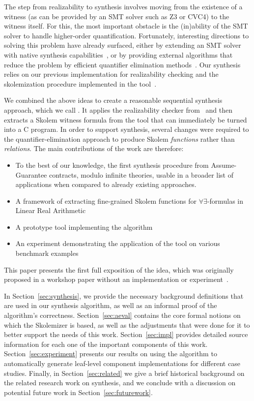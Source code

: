 The step from realizability to synthesis involves moving from the existence of a witness (as can be provided by an SMT solver such as Z3 or CVC4) to the witness itself.  For this, the most important obstacle is the (in)ability of the SMT solver to handle higher-order quantification. Fortunately, interesting directions to solving this problem have already surfaced, either by extending an SMT solver with native synthesis capabilities~\cite{reynoldscounterexample}, or by providing external algorithms that reduce the problem by efficient quantifier elimination methods~\cite{fedyukovichae}.  Our synthesis relies on our previous implementation for realizability checking and the skolemization procedure implemented in the \aeval tool~\cite{fedyukovichae}.


We combined the above ideas to create a reasonable sequential synthesis
approach, which we call \toolname.  It applies the realizability checker from~\cite{Katis15:Realizability} and then extracts a Skolem witness formula from the \aeval tool that can immediately be turned into a C program.  In order to support synthesis, several changes were required to the quantifier-elimination approach to produce Skolem {\em functions} rather than {\em relations}.  The main contributions of the work are therefore:
\begin{itemize}
	\item To the best of our knowledge, the first synthesis procedure from
	Assume-Guarantee contracts, modulo infinite theories, usable in a broader
	list of applications when compared to already existing approaches.
	\item A framework of extracting fine-grained Skolem functions for $\forall\exists$-formulas in Linear Real Arithmetic
	\item A prototype tool implementing the algorithm
	\item An experiment demonstrating the application of the tool on various benchmark examples
\end{itemize}

\noindent This paper presents the first full exposition of the idea, which was originally proposed in a workshop paper without an implementation or experiment~\cite{katis2016towards}.

In Section~\ref{sec:synthesis}, we provide the necessary background
definitions that are used in our synthesis algorithm, as well as an informal
proof of the algorithm's correctness. Section~\ref{sec:aeval} contains the
core formal notions on which the \aeval Skolemizer is based, as well
as the adjustments that were done for it to better support the needs of this
work. Section~\ref{sec:impl} provides detailed
source information for each one of the important
components of this work. Section~\ref{sec:experiment} presents our results on
using the algorithm to automatically generate leaf-level component implementations for different case studies.
Finally, in Section~\ref{sec:related} we give a brief historical background on the related research work on synthesis, and we conclude with a discussion on potential future work in Section~\ref{sec:futurework}.

